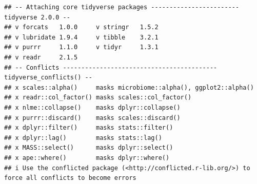 \documentclass[
]{article}
\begin{document}
\begin{verbatim}
## -- Attaching core tidyverse packages ------------------------ tidyverse 2.0.0 --
## v forcats   1.0.0     v stringr   1.5.2
## v lubridate 1.9.4     v tibble    3.2.1
## v purrr     1.1.0     v tidyr     1.3.1
## v readr     2.1.5     
## -- Conflicts ------------------------------------------ tidyverse_conflicts() --
## x scales::alpha()     masks microbiome::alpha(), ggplot2::alpha()
## x readr::col_factor() masks scales::col_factor()
## x nlme::collapse()    masks dplyr::collapse()
## x purrr::discard()    masks scales::discard()
## x dplyr::filter()     masks stats::filter()
## x dplyr::lag()        masks stats::lag()
## x MASS::select()      masks dplyr::select()
## x ape::where()        masks dplyr::where()
## i Use the conflicted package (<http://conflicted.r-lib.org/>) to force all conflicts to become errors
\end{verbatim}
\end{document}
